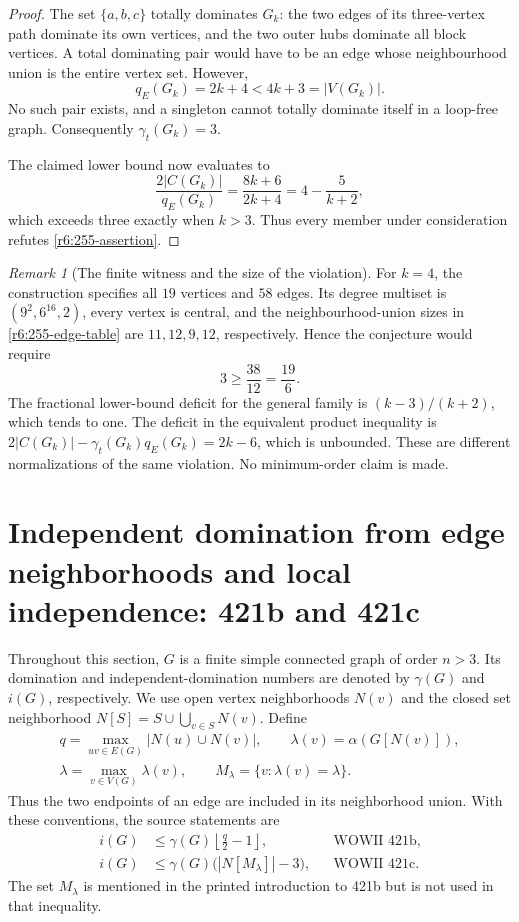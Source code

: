 \documentclass[11pt,a4paper]{article}
\theoremstyle{remark}
\newtheorem{remark}[theorem]{Remark}
\begin{document}
\begin{proof}
The set $\{a,b,c\}$ totally dominates $G_k$: the two edges of its
three-vertex path dominate its own vertices, and the two outer hubs
dominate all block vertices.  A total dominating pair would have to
be an edge whose neighbourhood union is the entire vertex set.
However,
\[
 q_E(G_k)=2k+4<4k+3=|V(G_k)|.
\]
No such pair exists, and a singleton cannot totally dominate itself
in a loop-free graph.  Consequently $\gamma_t(G_k)=3$.

The claimed lower bound now evaluates to
\[
 \frac{2|C(G_k)|}{q_E(G_k)}
   =\frac{8k+6}{2k+4}
   =4-\frac{5}{k+2},
\]
which exceeds three exactly when $k>3$.  Thus every member under
consideration refutes \eqref{r6:255-assertion}.
\end{proof}

\begin{remark}[The finite witness and the size of the violation]
\label{r6:255-finite}
For $k=4$, the construction specifies all $19$ vertices and $58$ edges.
Its degree multiset is $(9^2,6^{16},2)$, every vertex is central, and
the neighbourhood-union sizes in \eqref{r6:255-edge-table} are
$11,12,9,12$, respectively.  Hence the conjecture would require
\[
  3\ge\frac{38}{12}=\frac{19}{6}.
\]
The fractional lower-bound deficit for the general family is
$(k-3)/(k+2)$, which tends to one.  The deficit in the equivalent
product inequality is
$2|C(G_k)|-\gamma_t(G_k)q_E(G_k)=2k-6$, which is unbounded.
These are different normalizations of the same violation.
No minimum-order claim is made.
\end{remark}


\section{Independent domination from edge neighborhoods and local independence: 421b and 421c}
\label{r6id:section}

Throughout this section, $G$ is a finite simple connected graph of order
$n>3$.  Its domination and independent-domination numbers are denoted by
$\gamma(G)$ and $i(G)$, respectively.  We use open vertex neighborhoods
$N(v)$ and the closed set neighborhood $N[S]=S\cup\bigcup_{v\in S}N(v)$.
Define
\begin{gather*}
 q=\max_{uv\in E(G)}|N(u)\cup N(v)|,\qquad
 \lambda(v)=\alpha(G[N(v)]),\\
 \lambda=\max_{v\in V(G)}\lambda(v),\qquad
 M_\lambda=\{v:\lambda(v)=\lambda\}.
\end{gather*}
Thus the two endpoints of an edge are included in its neighborhood union.
With these conventions, the source statements are
\begin{align}
 i(G)&\leq\gamma(G)\left\lfloor\frac q2-1\right\rfloor,
       &&\text{WOWII 421b},\label{r6id:421b-original}\\
 i(G)&\leq\gamma(G)\bigl(|N[M_\lambda]|-3\bigr),
       &&\text{WOWII 421c}.\label{r6id:421c-original}
\end{align}
The set $M_\lambda$ is mentioned in the printed introduction to 421b but
is not used in that inequality.
\end{document}
